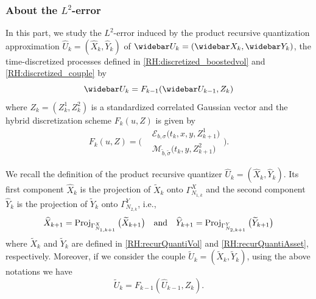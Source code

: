 \begin{remark}
\end{remark}


\subsubsection{About the $L^2$-error}

In this part, we study the $L^2$-error induced by the product recursive quantization approximation $\widehat U_k = (\widehat X_k, \widehat Y_k )$ of $\widebar U_k = (\widebar X_k, \widebar Y_k)$, the time-discretized processes defined in \eqref{RH:discretized_boostedvol} and \eqref{RH:discretized_couple} by
\begin{equation}\label{RH:timescheme_U}
	\widebar U_k = F_{k-1} ( \widebar U_{k-1}, Z_k)
\end{equation}
where $Z_k = (Z_k^1, Z_k^2)$ is a standardized correlated Gaussian vector and the hybrid discretization scheme $F_k(u, Z)$ is given by
\begin{equation}
	F_k(u, Z) = \Bigg(
	\begin{aligned}
		 & \mathcal{E}_{b, \sigma} \big( t_k, x, y, Z_{k+1}^1 \big)                    \\
		 & \mathcal{M}_{\widetilde b, \widetilde \sigma} \big( t_k, y, Z_{k+1}^2 \big)
	\end{aligned} \Bigg).
\end{equation}


We recall the definition of the product recursive quantizer $\widehat U_k = (\widehat X_k, \widehat Y_k)$. Its first component $\widehat X_k$ is the projection of $\widetilde X_k$ onto $\Gamma_{N_{1,k}}^X$ and the second component $\widehat Y_k$ is the projection of $\widetilde Y_k$ onto $\Gamma_{N_{2,k}}^Y$, i.e.,
\begin{equation}\label{RH:recur_quantization_U}
	\widehat X_{k+1} = \operatorname{\mathrm{Proj}}_{\Gamma_{N_{1,k+1}}^X} \big( \widetilde{X}_{k+1} \big) \quad \mbox{and} \quad \widehat Y_{k+1} = \operatorname{\mathrm{Proj}}_{\Gamma_{N_{2,k+1}}^Y} \big( \widetilde{Y}_{k+1} \big)
\end{equation}
where $\widetilde X_k$ and $\widetilde Y_k$ are defined in \eqref{RH:recurQuantiVol} and \eqref{RH:recurQuantiAsset}, respectively. Moreover, if we consider the couple $\widetilde U_k = (\widetilde X_k, \widetilde Y_k)$, using the above notations we have
\begin{equation}\label{RH:diffusion_quantized_schem_U}
	\widetilde U_k = F_{k-1} ( \widehat U_{k-1}, Z_k ).
\end{equation}

